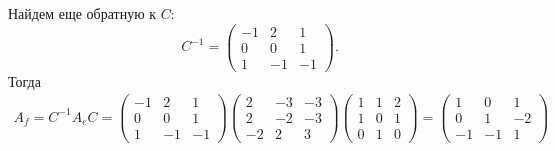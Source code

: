 Найдем еще обратную к $C$:
\begin{equation}
    C^{-1} = 
    \begin{pmatrix}
        -1 &  2 &  1 \\
         0 &  0 &  1 \\ 
         1 & -1 & -1
    \end{pmatrix}.
\end{equation}
Тогда
\begin{gather}
    A_f = C^{-1}A_eC = 
    \begin{pmatrix}
        -1 &  2 &  1 \\
        0 &  0 &  1 \\ 
        1 & -1 & -1
    \end{pmatrix}
    \begin{pmatrix}
        2 & -3 & -3 \\
        2 & -2 & -3 \\
       -2 &  2 &  3
    \end{pmatrix}
    \begin{pmatrix}
        1 & 1 & 2 \\
        1 & 0 & 1 \\ 
        0 & 1 & 0
    \end{pmatrix} = 
    \begin{pmatrix}
         1 &  0 &  1 \\
         0 &  1 & -2 \\
        -1 & -1 &  1
    \end{pmatrix}
\end{gather}
